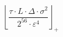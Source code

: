 \[\left\lfloor \frac{\tau \cdot L \cdot \Delta \cdot \sigma^{2}}{2^{56} \cdot \varepsilon^{4}} \right\rfloor_{+}\]
